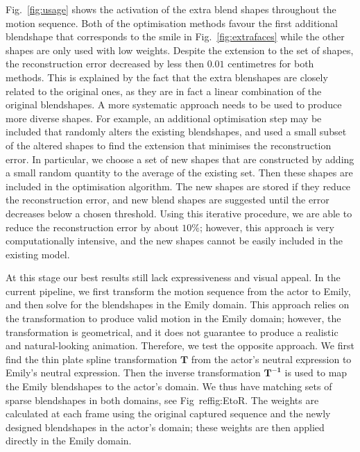 \documentclass[11pt]{report}
\begin{document}
Fig.~\ref{fig:usage} shows the activation of the extra blend shapes throughout the motion sequence. Both of the optimisation methods favour the first additional blendshape that corresponds to the smile in Fig.~\ref{fig:extrafaces} while the other shapes are only used with low weights. Despite the extension to the set of shapes, the reconstruction error decreased by less then $0.01$ centimetres for both methods. This is explained by the fact that the extra blenshapes are closely related to the original ones, as they are in fact a linear combination of the original blendshapes. A more systematic approach needs to be used to produce more diverse shapes. For example, an additional optimisation step may be included that randomly alters the existing blendshapes, and used a small subset of the altered shapes to find the extension that minimises the reconstruction error. In particular, we choose a set of new shapes that are constructed by adding a small random quantity to the average of the existing set. Then these shapes are included in the optimisation algorithm. The new shapes are stored if they reduce the reconstruction error, and new blend shapes are suggested until the error decreases below a chosen threshold. Using this iterative procedure, we are able to reduce the reconstruction error by about $10 \%$; however, this approach is very computationally intensive, and the new shapes cannot be easily included in the existing model. 



At this stage our best results still lack expressiveness and visual appeal. In the current pipeline, we first transform the motion sequence from the actor to Emily, and then solve for the blendshapes in the Emily domain. This approach relies on the transformation to produce valid motion in the Emily domain; however, the transformation is geometrical, and it does not guarantee to produce a realistic and natural-looking animation. Therefore, we test the opposite approach. We first find the thin plate spline transformation $\mathbf{T}$ from the actor's neutral expression to Emily's neutral expression. Then the inverse transformation $\mathbf{T^{-1}}$ is used to map the Emily blendshapes to the actor's domain. We thus have matching sets of sparse blendshapes in both domains, see Fig~ref{fig:EtoR}. The weights are calculated at each frame using the original captured sequence and the newly designed blendshapes in the actor's domain; these weights are then applied directly in the Emily domain. 
\end{document}
